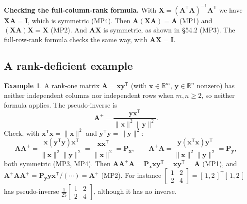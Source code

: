 \documentclass[11pt]{article}
\theoremstyle{plain}
\theoremstyle{definition}
\newtheorem{ex}{Example}[section]
\theoremstyle{remark}
\newcommand{\R}{\mathbb{R}}
\newcommand{\vc}[1]{\mathbf{#1}}
\newcommand{\mt}[1]{\mathbf{#1}}
\newcommand{\norm}[1]{\lVert #1\rVert}
\newcommand{\T}{^{\mathsf{T}}}
\begin{document}
\textbf{Checking the full-column-rank formula.} With
$\mt{X}=(\mt{A}\T\mt{A})^{-1}\mt{A}\T$ we have $\mt{X}\mt{A}=\mt{I}$, which is
symmetric (MP4). Then $\mt{A}(\mt{X}\mt{A})=\mt{A}$ (MP1) and
$(\mt{X}\mt{A})\mt{X}=\mt{X}$ (MP2). And $\mt{A}\mt{X}$ is symmetric, as shown in
\S54.2 (MP3). The full-row-rank formula checks the same way, with $\mt{A}\mt{X}=\mt{I}$.

\subsection{A rank-deficient example}
\begin{ex}
\label{ex:rankone}
A rank-one matrix $\mt{A}=\vc{x}\vc{y}\T$ (with $\vc{x}\in\R^{m}$, $\vc{y}\in\R^{n}$
nonzero) has neither independent columns nor independent rows when $m,n\ge2$, so
neither formula applies. The pseudo-inverse is
\[
  \mt{A}^{+}=\frac{\vc{y}\vc{x}\T}{\norm{\vc{x}}^{2}\norm{\vc{y}}^{2}} .
\]
Check, with $\vc{x}\T\vc{x}=\norm{\vc{x}}^{2}$ and $\vc{y}\T\vc{y}=\norm{\vc{y}}^{2}$:
\[
  \mt{A}\mt{A}^{+}=\frac{\vc{x}(\vc{y}\T\vc{y})\vc{x}\T}{\norm{\vc{x}}^{2}\norm{\vc{y}}^{2}}
  =\frac{\vc{x}\vc{x}\T}{\norm{\vc{x}}^{2}}=\mt{P}_{\vc{x}},
  \qquad
  \mt{A}^{+}\mt{A}=\frac{\vc{y}(\vc{x}\T\vc{x})\vc{y}\T}{\norm{\vc{x}}^{2}\norm{\vc{y}}^{2}}
  =\mt{P}_{\vc{y}},
\]
both symmetric (MP3, MP4). Then $\mt{A}\mt{A}^{+}\mt{A}=\mt{P}_{\vc{x}}\vc{x}\vc{y}\T=\vc{x}\vc{y}\T=\mt{A}$
(MP1), and $\mt{A}^{+}\mt{A}\mt{A}^{+}=\mt{P}_{\vc{y}}\vc{y}\vc{x}\T/(\cdots)=\mt{A}^{+}$
(MP2). For instance
$\begin{bmatrix}1&2\\2&4\end{bmatrix}=[\,1,2\,]\T[\,1,2\,]$ has pseudo-inverse
$\frac{1}{25}\begin{bmatrix}1&2\\2&4\end{bmatrix}$, although it has no inverse.
\end{ex}

\end{document}
